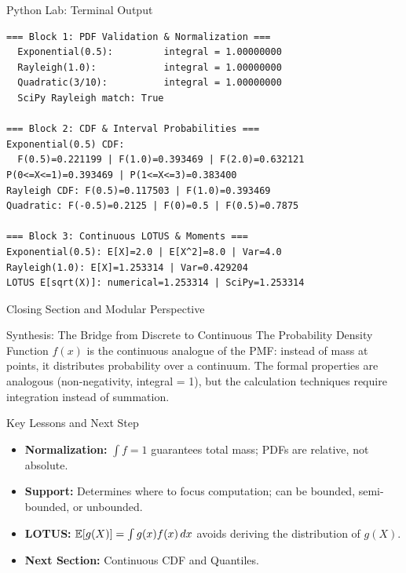 \documentclass[aspectratio=169,xcolor={dvipsnames,table}]{beamer}
\begin{document}
\begin{frame}[fragile]{Python Lab: Terminal Output}
	\vspace{-0.1cm}
	\begin{block}{}
		\fontsize{4pt}{5pt}\selectfont
		\begin{verbatim}
=== Block 1: PDF Validation & Normalization ===
  Exponential(0.5):         integral = 1.00000000
  Rayleigh(1.0):            integral = 1.00000000
  Quadratic(3/10):          integral = 1.00000000
  SciPy Rayleigh match: True

=== Block 2: CDF & Interval Probabilities ===
Exponential(0.5) CDF:
  F(0.5)=0.221199 | F(1.0)=0.393469 | F(2.0)=0.632121
P(0<=X<=1)=0.393469 | P(1<=X<=3)=0.383400
Rayleigh CDF: F(0.5)=0.117503 | F(1.0)=0.393469
Quadratic: F(-0.5)=0.2125 | F(0)=0.5 | F(0.5)=0.7875

=== Block 3: Continuous LOTUS & Moments ===
Exponential(0.5): E[X]=2.0 | E[X^2]=8.0 | Var=4.0
Rayleigh(1.0): E[X]=1.253314 | Var=0.429204
LOTUS E[sqrt(X)]: numerical=1.253314 | SciPy=1.253314
		\end{verbatim}
	\end{block}
\end{frame}









\begin{frame}{Closing Section and Modular Perspective}
	\vspace{-0.2cm}
	\begin{block}{Synthesis: The Bridge from Discrete to Continuous}
		\scriptsize
		The Probability Density Function $f(x)$ is the continuous analogue of the PMF: instead of mass at points, it distributes probability over a continuum. The formal properties are analogous (non-negativity, integral = 1), but the calculation techniques require integration instead of summation.
	\end{block}
	\vspace{0.05cm}
	\pause
	\begin{alertblock}{Key Lessons and Next Step}
		\begin{itemize}\itemsep=0.05cm
			\item \textbf{Normalization:} $\int f = 1$ guarantees total mass; PDFs are relative, not absolute.
			\item \textbf{Support:} Determines where to focus computation; can be bounded, semi-bounded, or unbounded.
			\item \textbf{LOTUS:} $\mathbb{E}[g(X)] = \int g(x) f(x)\,dx$ avoids deriving the distribution of $g(X)$.
			\item \textbf{Next Section:} \textcolor{TecRojo}{Continuous CDF and Quantiles}.
		\end{itemize}
	\end{alertblock}
\end{frame}
\end{document}
